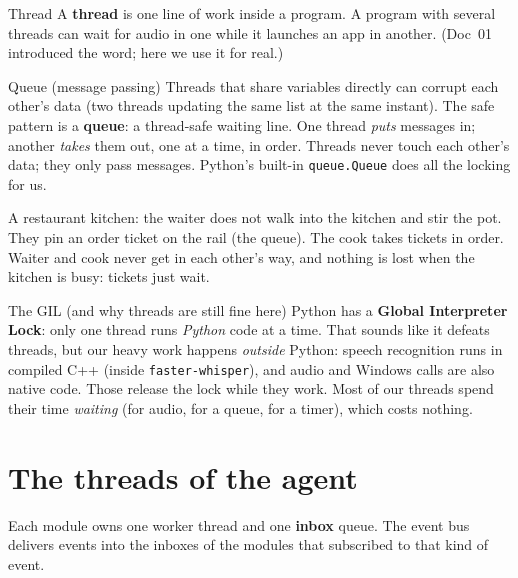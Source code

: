 \documentclass[11pt,a4paper]{article}
\begin{document}
\begin{concept}{Thread}
A \textbf{thread} is one line of work inside a program. A program with several threads can
wait for audio in one while it launches an app in another. (Doc~01 introduced the word; here
we use it for real.)
\end{concept}

\begin{concept}{Queue (message passing)}
Threads that share variables directly can corrupt each other's data (two threads updating the
same list at the same instant). The safe pattern is a \textbf{queue}: a thread-safe waiting
line. One thread \emph{puts} messages in; another \emph{takes} them out, one at a time, in
order. Threads never touch each other's data; they only pass messages. Python's built-in
\texttt{queue.Queue} does all the locking for us.
\end{concept}

\begin{analogy}
A restaurant kitchen: the waiter does not walk into the kitchen and stir the pot. They pin an
order ticket on the rail (the queue). The cook takes tickets in order. Waiter and cook never
get in each other's way, and nothing is lost when the kitchen is busy: tickets just wait.
\end{analogy}

\begin{concept}{The GIL (and why threads are still fine here)}
Python has a \textbf{Global Interpreter Lock}: only one thread runs \emph{Python} code at a time.
That sounds like it defeats threads, but our heavy work happens \emph{outside} Python:
speech recognition runs in compiled C++ (inside \texttt{faster-whisper}), and audio and
Windows calls are also native code. Those release the lock while they work. Most of our
threads spend their time \emph{waiting} (for audio, for a queue, for a timer), which costs
nothing.
\end{concept}

\section{The threads of the agent}

Each module owns one worker thread and one \textbf{inbox} queue. The event bus delivers events
into the inboxes of the modules that subscribed to that kind of event.
\end{document}
